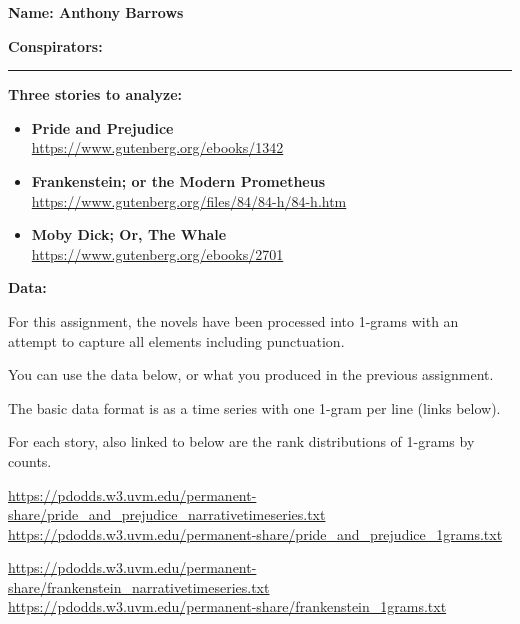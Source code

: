 \textbf{Name: Anthony Barrows} \\

\medskip

\textbf{Conspirators:} 

\medskip
\medskip

\hrule

\medskip




\assignmentsonly{\pleasesubmitprojectdraft}



\textbf{Three stories to analyze:}

\begin{itemize}
\item
  \textbf{Pride and Prejudice}\\
  \url{https://www.gutenberg.org/ebooks/1342}
\item
  \textbf{Frankenstein; or the Modern Prometheus}\\
  \url{https://www.gutenberg.org/files/84/84-h/84-h.htm}
\item
  \textbf{Moby Dick; Or, The Whale}\\
  \url{https://www.gutenberg.org/ebooks/2701}
\end{itemize}

\textbf{Data:}

For this assignment, the novels have been processed into 1-grams
with an attempt to capture all elements including punctuation.

You can use the data below, or what you produced in the previous assignment.

The basic data format is as a time series with one 1-gram per line (links below).

For each story, also linked to below are the rank distributions of 1-grams by counts.

\url{https://pdodds.w3.uvm.edu/permanent-share/pride_and_prejudice_narrativetimeseries.txt}\\
\url{https://pdodds.w3.uvm.edu/permanent-share/pride_and_prejudice_1grams.txt}

\url{https://pdodds.w3.uvm.edu/permanent-share/frankenstein_narrativetimeseries.txt}\\
\url{https://pdodds.w3.uvm.edu/permanent-share/frankenstein_1grams.txt}

